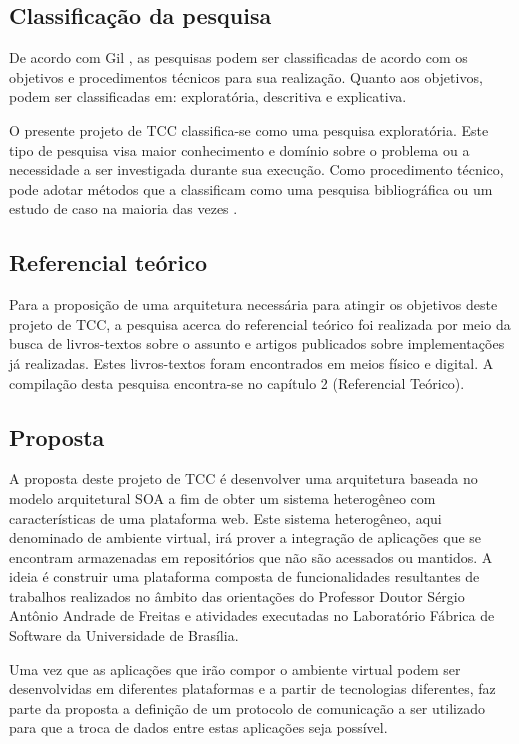 \subsection{Classificação da pesquisa}
De acordo com Gil \cite{gil_como_2008}, as pesquisas podem ser classificadas de acordo com os objetivos e procedimentos técnicos para sua realização. Quanto aos objetivos, podem ser classificadas em: exploratória, descritiva e explicativa. 

O presente projeto de TCC classifica-se como uma pesquisa exploratória. Este tipo de pesquisa visa maior conhecimento e domínio sobre o problema ou a necessidade a ser investigada durante sua execução. Como procedimento técnico, pode adotar métodos que a classificam como uma pesquisa bibliográfica ou um estudo de caso na maioria das vezes \cite{gil_como_2008}.

\subsection{Referencial teórico}
Para a proposição de uma arquitetura necessária para atingir os objetivos deste projeto de TCC, a pesquisa acerca do referencial teórico foi realizada por meio da busca de livros-textos sobre o assunto e artigos publicados sobre implementações já realizadas. Estes livros-textos foram encontrados em meios físico e digital. A compilação desta pesquisa encontra-se no capítulo 2 (Referencial Teórico).

\subsection{Proposta}
A proposta deste projeto de TCC é desenvolver uma arquitetura baseada no modelo arquitetural SOA a fim de obter um sistema heterogêneo com características de uma plataforma web. Este sistema heterogêneo, aqui denominado de ambiente virtual, irá prover a integração de aplicações que se encontram armazenadas em repositórios que não são acessados ou mantidos. A ideia é construir uma plataforma composta de funcionalidades resultantes de trabalhos realizados no âmbito das orientações do Professor Doutor Sérgio Antônio Andrade de Freitas e atividades executadas no Laboratório Fábrica de Software da Universidade de Brasília.

Uma vez que as aplicações que irão compor o ambiente virtual podem ser desenvolvidas em diferentes plataformas e a partir de tecnologias diferentes, faz parte da proposta a definição de um protocolo de comunicação a ser utilizado para que a troca de dados entre estas aplicações seja possível.

